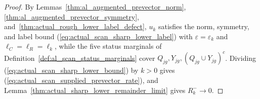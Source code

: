 \begin{proof}
    \leanok
    By Lemmas~\ref{thm:al_augmented_prevector_norm},
    \ref{thm:al_augmented_prevector_symmetry},
    and~\ref{thm:actual_rough_lower_label_defect}, $u_k$ satisfies the
    norm, symmetry, and label bound (\ref{eq:actual_scan_sharp_lower_label})
    with $\varepsilon=\varepsilon_k$ and $\ell_C=\ell_R=\ell_k$, while the
    five status marginals of Definition~\ref{def:al_scan_status_marginals}
    cover $Q_{jg},Y_{jg},(Q_{jg}\cup Y_{jg})^c$. Dividing
    (\ref{eq:actual_scan_sharp_lower_bound}) by $k>0$ gives
    (\ref{eq:actual_scan_supplied_prevector_rate}), and
    Lemma~\ref{thm:actual_sharp_lower_remainder_limit} gives
    $R_k^-\to0$.
\end{proof}
